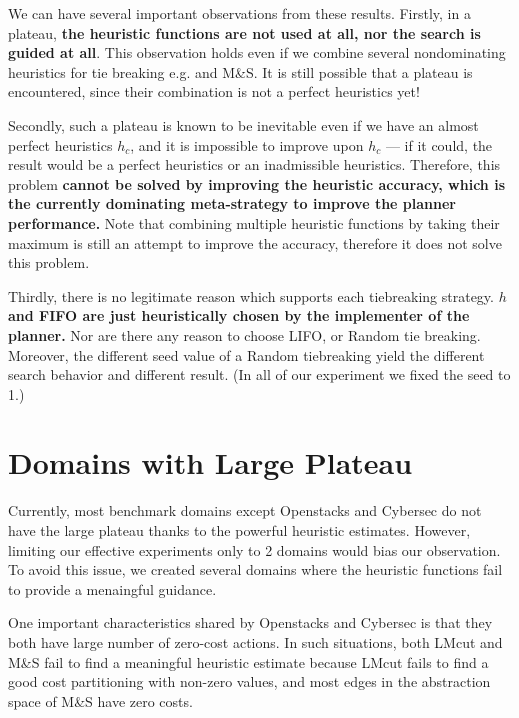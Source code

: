 We can have several important observations from these results.  Firstly, in a plateau, \textbf{the heuristic functions are not used at all, nor the search is guided at all}. This observation holds even if we combine several nondominating heuristics for tie breaking e.g. \lmcut and M\&S.  It is still possible that a plateau is encountered, since their combination is not a perfect heuristics yet!

Secondly, such a plateau is known to be inevitable even if we have an almost perfect heuristics $h_c$, and it is impossible to improve upon $h_c$ --- if it could, the result would be a perfect heuristics or an inadmissible heuristics. Therefore, this problem \textbf{cannot be solved by improving the heuristic accuracy, which is the currently dominating meta-strategy to improve the planner performance.}  Note that combining multiple heuristic functions by taking their maximum is still an attempt to improve the accuracy, therefore it does not solve this problem.

Thirdly, there is no legitimate reason which supports each tiebreaking strategy. \textbf{$h$ and FIFO are just heuristically chosen by the implementer of the planner.} Nor are there any reason to choose LIFO, or Random tie breaking. Moreover, the different seed value of a Random tiebreaking yield the different search behavior and different result. (In all of our experiment we fixed the seed to 1.)


\section{Domains with Large Plateau}

Currently, most benchmark domains except Openstacks and Cybersec do not
have the large plateau thanks to the powerful heuristic
estimates. However, limiting our effective experiments only to 2 domains
would bias our observation. To avoid this issue, we created several
domains where the \sota heuristic functions fail to provide a
menaingful guidance.

One important characteristics shared by Openstacks and Cybersec is that they both
have large number of zero-cost actions. In such situations, both LMcut
and M\&S fail to find a meaningful heuristic estimate because LMcut fails to
find a good cost partitioning with non-zero values, and most edges in the abstraction space of
M\&S have zero costs.


